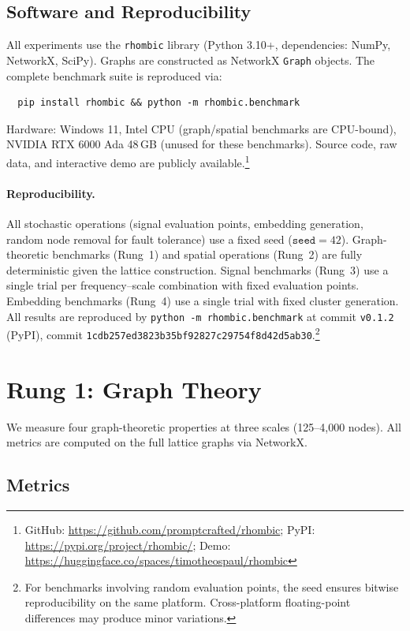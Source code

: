 \documentclass[11pt]{article}
\begin{document}
\subsection{Software and Reproducibility}

All experiments use the \texttt{rhombic} library (Python 3.10+,
dependencies: NumPy, NetworkX, SciPy). Graphs are constructed as
NetworkX \texttt{Graph} objects. The complete benchmark suite is
reproduced via:
\begin{verbatim}
  pip install rhombic && python -m rhombic.benchmark
\end{verbatim}
Hardware: Windows 11, Intel CPU (graph/spatial benchmarks are
CPU-bound), NVIDIA RTX 6000 Ada 48\,GB (unused for these
benchmarks). Source code, raw data, and interactive demo are
publicly available.\footnote{%
GitHub: \url{https://github.com/promptcrafted/rhombic};
PyPI: \url{https://pypi.org/project/rhombic/};
Demo: \url{https://huggingface.co/spaces/timotheospaul/rhombic}}

\paragraph{Reproducibility.}
All stochastic operations (signal evaluation points, embedding
generation, random node removal for fault tolerance) use a fixed
seed ($\mathtt{seed}=42$). Graph-theoretic benchmarks (Rung~1)
and spatial operations (Rung~2) are fully deterministic given the
lattice construction. Signal benchmarks (Rung~3) use a single
trial per frequency--scale combination with fixed evaluation
points. Embedding benchmarks (Rung~4) use a single trial with
fixed cluster generation. All results are reproduced by
\texttt{python~-m~rhombic.benchmark} at commit
\texttt{v0.1.2} (PyPI), commit
\texttt{1cdb257ed3823b35bf92827c29754f8d42d5ab30}.\footnote{For benchmarks involving random
evaluation points, the seed ensures bitwise reproducibility on the
same platform. Cross-platform floating-point differences may
produce minor variations.}

\section{Rung 1: Graph Theory}
\label{sec:graph}

We measure four graph-theoretic properties at three scales
(125--4{,}000 nodes). All metrics are computed on the full
lattice graphs via NetworkX.

\subsection{Metrics}
\end{document}
